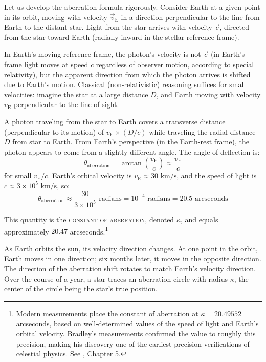 Let us develop the aberration formula rigorously. Consider Earth at a given point in its orbit, moving with velocity $\vec{v}_{\text{E}}$ in a direction perpendicular to the line from Earth to the distant star. Light from the star arrives with velocity $\vec{c}$, directed from the star toward Earth (radially inward in the stellar reference frame).

In Earth's moving reference frame, the photon's velocity is not $\vec{c}$ (in Earth's frame light moves at speed $c$ regardless of observer motion, according to special relativity), but the apparent direction from which the photon arrives is shifted due to Earth's motion. Classical (non-relativistic) reasoning suffices for small velocities: imagine the star at a large distance $D$, and Earth moving with velocity $v_{\text{E}}$ perpendicular to the line of sight.

A photon traveling from the star to Earth covers a transverse distance (perpendicular to its motion) of $v_{\text{E}} \times (D/c)$ while traveling the radial distance $D$ from star to Earth. From Earth's perspective (in the Earth-rest frame), the photon appears to come from a slightly different angle. The angle of deflection is:
\[
  \theta_{\text{aberration}} = \arctan\left(\frac{v_{\text{E}}}{c}\right) \approx \frac{v_{\text{E}}}{c}
\]
for small $v_{\text{E}}/c$. Earth's orbital velocity is $v_{\text{E}} \approx 30 \text{ km/s}$, and the speed of light is $c \approx 3 \times 10^5 \text{ km/s}$, so:
\[
  \theta_{\text{aberration}} \approx \frac{30}{3 \times 10^5} \text{ radians} = 10^{-4} \text{ radians} = 20.5 \text{ arcseconds}
\]

This quantity is the \textsc{constant of aberration}, denoted $\kappa$, and equals approximately $20.47$ arcseconds.\footnote{Modern measurements place the constant of aberration at $\kappa = 20.49552$ arcseconds, based on well-determined values of the speed of light and Earth's orbital velocity. Bradley's measurements confirmed the value to roughly this precision, making his discovery one of the earliest precision verifications of celestial physics. See \textcite{Feingold1984}, Chapter 5.}

As Earth orbits the sun, its velocity direction changes. At one point in the orbit, Earth moves in one direction; six months later, it moves in the opposite direction. The direction of the aberration shift rotates to match Earth's velocity direction. Over the course of a year, a star traces an aberration circle with radius $\kappa$, the center of the circle being the star's true position.

